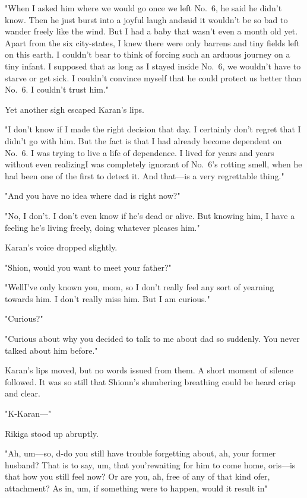 "When I asked him where we would go once we left No.~6, he said he
didn't know. Then he just burst into a joyful laugh and\el said it
wouldn't be so bad to wander freely like the wind. But I had a baby that
wasn't even a month old yet. Apart from the six city-states, I knew
there were only barrens and tiny fields left on this earth. I couldn't
bear to think of forcing such an arduous journey on a tiny infant. I
supposed that as long as I stayed inside No.~6, we wouldn't have to
starve or get sick. I couldn't convince myself that he could protect us
better than No.~6. I couldn't trust him."

Yet another sigh escaped Karan's lips.

"I don't know if I made the right decision that day. I certainly don't
regret that I didn't go with him. But the fact is that I had already
become dependent on No.~6. I was trying to live a life of dependence. I
lived for years and years without even realizing\el I was completely
ignorant of No.~6's rotting smell, when he had been one of the first to
detect it. And that---is a very regrettable thing."

"And you have no idea where dad is right now?"

"No, I don't. I don't even know if he's dead or alive. But knowing him,
I have a feeling he's living freely, doing whatever pleases him."

Karan's voice dropped slightly.

"Shion, would you want to meet your father?"

"Well\el I've only known you, mom, so I don't really feel any sort of
yearning towards him. I don't really miss him. But I am curious."

"Curious?"

"Curious about why you decided to talk to me about dad so suddenly. You
never talked about him before."

Karan's lips moved, but no words issued from them. A short moment of
silence followed. It was so still that Shionn's slumbering breathing
could be heard crisp and clear.

\mybreak

"K-Karan---"

Rikiga stood up abruptly.

"Ah, um---so, d-do you still have trouble forgetting about, ah, your
former husband? That is to say, um, that you're\el waiting for him to
come home, or\el is---is that how you still feel now? Or are you, ah, free
of any of that kind of\el er, attachment? As in, um, if something were
to happen, would it result in\el "

